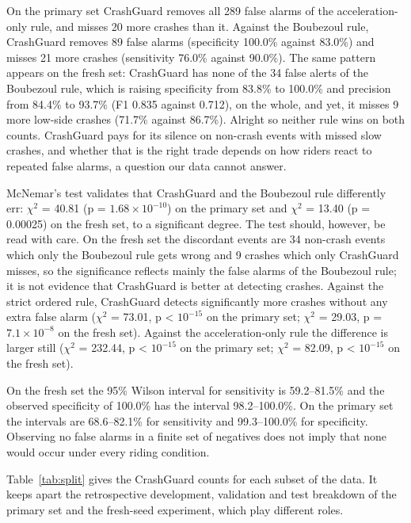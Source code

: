 \documentclass[10pt,a4paper]{article}
\begin{document}
On the primary set CrashGuard removes all 289 false alarms of the acceleration-only rule, and misses 20 more crashes than it. Against the Boubezoul rule, CrashGuard removes 89 false alarms (specificity 100.0\% against 83.0\%) and misses 21 more crashes (sensitivity 76.0\% against 90.0\%). The same pattern appears on the fresh set: CrashGuard has none of the 34 false alerts of the Boubezoul rule, which is raising specificity from 83.8\% to 100.0\% and precision from 84.4\% to 93.7\% (F1 0.835 against 0.712), on the whole, and yet, it misses 9 more low-side crashes (71.7\% against 86.7\%). Alright so neither rule wins on both counts. CrashGuard pays for its silence on non-crash events with missed slow crashes, and whether that is the right trade depends on how riders react to repeated false alarms, a question our data cannot answer.

McNemar's test validates that CrashGuard and the Boubezoul rule differently err: $\chi^2$ = 40.81 (p = $1.68\times10^{-10}$) on the primary set and $\chi^2$ = 13.40 (p = 0.00025) on the fresh set, to a significant degree. The test should, however, be read with care. On the fresh set the discordant events are 34 non-crash events which only the Boubezoul rule gets wrong and 9 crashes which only CrashGuard misses, so the significance reflects mainly the false alarms of the Boubezoul rule; it is not evidence that CrashGuard is better at detecting crashes. Against the strict ordered rule, CrashGuard detects significantly more crashes without any extra false alarm ($\chi^2$ = 73.01, p < $10^{-15}$ on the primary set; $\chi^2$ = 29.03, p = $7.1\times10^{-8}$ on the fresh set). Against the acceleration-only rule the difference is larger still ($\chi^2$ = 232.44, p < $10^{-15}$ on the primary set; $\chi^2$ = 82.09, p < $10^{-15}$ on the fresh set).

On the fresh set the 95\% Wilson interval for sensitivity is 59.2--81.5\% and the observed specificity of 100.0\% has the interval 98.2--100.0\%. On the primary set the intervals are 68.6--82.1\% for sensitivity and 99.3--100.0\% for specificity. Observing no false alarms in a finite set of negatives does not imply that none would occur under every riding condition.

Table~\ref{tab:split} gives the CrashGuard counts for each subset of the data. It keeps apart the retrospective development, validation and test breakdown of the primary set and the fresh-seed experiment, which play different roles.
\end{document}
